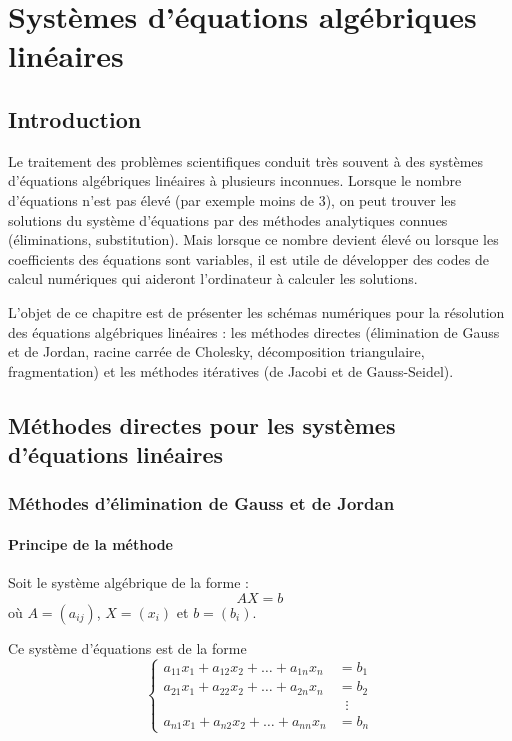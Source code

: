 \chapter{Systèmes d'équations algébriques linéaires}

\section{Introduction}

Le traitement des problèmes scientifiques conduit très souvent à des systèmes
d'équations algébriques linéaires à plusieurs inconnues. Lorsque le nombre
d'équations n'est pas élevé (par exemple moins de 3), on peut trouver les
solutions du système d'équations par des méthodes analytiques connues
(éliminations, substitution). Mais lorsque ce nombre devient élevé ou lorsque
les coefficients des équations sont variables, il est utile de développer des
codes de calcul numériques qui aideront l'ordinateur à calculer les solutions.

L'objet de ce chapitre est de présenter les schémas numériques pour la
résolution des équations algébriques linéaires : les méthodes directes
(élimination de Gauss et de Jordan, racine carrée de Cholesky, décomposition
triangulaire, fragmentation) et les méthodes itératives (de Jacobi et de
Gauss-Seidel).

\section{Méthodes directes pour les systèmes d'équations linéaires}

\subsection{Méthodes d'élimination de Gauss et de Jordan}

\subsubsection{Principe de la méthode}

Soit le système algébrique de la forme :
\[
  AX = b
\]
où $A = (a_{ij})$, $X = (x_i)$ et $b = (b_i)$.

Ce système d'équations est de la forme
\[
  \left\{
  \begin{aligned}
    a_{11}x_1 + a_{12}x_2 + \dots + a_{1n}x_n &= b_1\\
    a_{21}x_1 + a_{22}x_2 + \dots + a_{2n}x_n &= b_2\\
    &\;\;\vdots\\
    a_{n1}x_1 + a_{n2}x_2 + \dots + a_{nn}x_n &= b_n
  \end{aligned}
  \right.
\]

